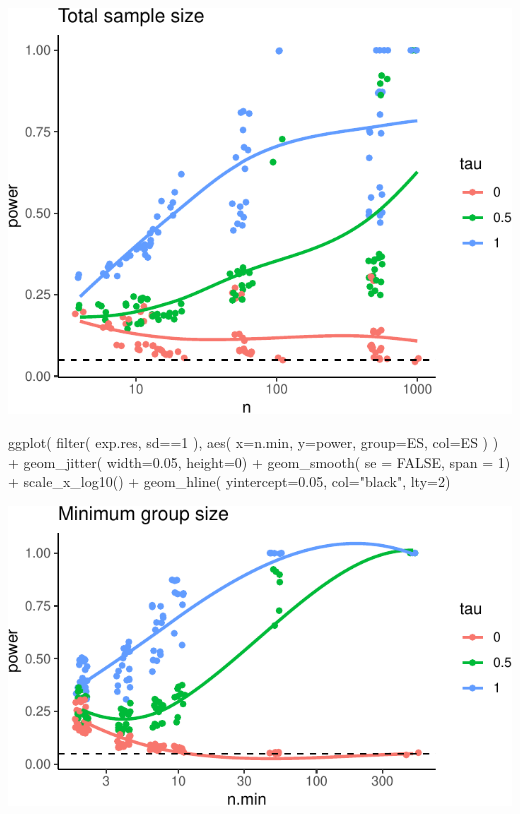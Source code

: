 \documentclass[
]{book}
\newenvironment{Shaded}{\begin{snugshade}}{\end{snugshade}}
\newcommand{\AttributeTok}[1]{\textcolor[rgb]{0.77,0.63,0.00}{#1}}
\newcommand{\ConstantTok}[1]{\textcolor[rgb]{0.00,0.00,0.00}{#1}}
\newcommand{\DecValTok}[1]{\textcolor[rgb]{0.00,0.00,0.81}{#1}}
\newcommand{\FloatTok}[1]{\textcolor[rgb]{0.00,0.00,0.81}{#1}}
\newcommand{\FunctionTok}[1]{\textcolor[rgb]{0.00,0.00,0.00}{#1}}
\newcommand{\NormalTok}[1]{#1}
\newcommand{\SpecialCharTok}[1]{\textcolor[rgb]{0.00,0.00,0.00}{#1}}
\newcommand{\StringTok}[1]{\textcolor[rgb]{0.31,0.60,0.02}{#1}}
\begin{document}
\begin{center}\includegraphics[width=0.75\linewidth]{Designing-Simulations-in-R_files/figure-latex/plotA-1} \end{center}

\begin{Shaded}
\begin{Highlighting}[]
\FunctionTok{ggplot}\NormalTok{( }\FunctionTok{filter}\NormalTok{( exp.res, sd}\SpecialCharTok{==}\DecValTok{1}\NormalTok{ ), }\FunctionTok{aes}\NormalTok{( }\AttributeTok{x=}\NormalTok{n.min, }\AttributeTok{y=}\NormalTok{power, }\AttributeTok{group=}\NormalTok{ES, }\AttributeTok{col=}\NormalTok{ES ) ) }\SpecialCharTok{+}
  \FunctionTok{geom\_jitter}\NormalTok{( }\AttributeTok{width=}\FloatTok{0.05}\NormalTok{, }\AttributeTok{height=}\DecValTok{0}\NormalTok{) }\SpecialCharTok{+}
  \FunctionTok{geom\_smooth}\NormalTok{( }\AttributeTok{se =} \ConstantTok{FALSE}\NormalTok{, }\AttributeTok{span =} \DecValTok{1}\NormalTok{) }\SpecialCharTok{+}
  \FunctionTok{scale\_x\_log10}\NormalTok{() }\SpecialCharTok{+}
  \FunctionTok{geom\_hline}\NormalTok{( }\AttributeTok{yintercept=}\FloatTok{0.05}\NormalTok{, }\AttributeTok{col=}\StringTok{"black"}\NormalTok{, }\AttributeTok{lty=}\DecValTok{2}\NormalTok{)}
\end{Highlighting}
\end{Shaded}

\begin{center}\includegraphics[width=0.75\linewidth]{Designing-Simulations-in-R_files/figure-latex/plotB-1} \end{center}
\end{document}
